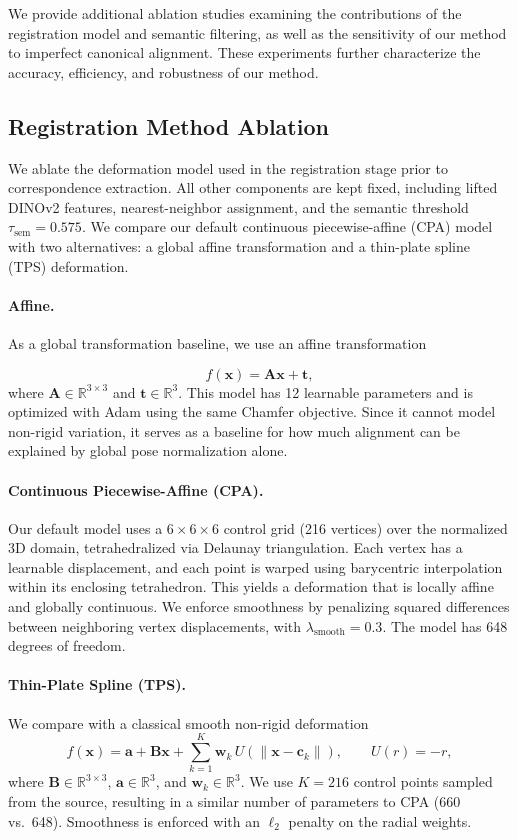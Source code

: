 We provide additional ablation studies examining the
contributions of the registration model and semantic filtering,
as well as the sensitivity of our method to imperfect
canonical alignment. These experiments further characterize
the accuracy, efficiency, and robustness of our method.

\subsection{Registration Method Ablation}
\label{sup:ablation_registration}

We ablate the deformation model used in the registration stage prior to correspondence extraction. All other components are kept fixed, including lifted DINOv2 \cite{oquab2024dinov2} features, nearest-neighbor assignment, and the semantic threshold $\tau_{\mathrm{sem}}=0.575$. We compare our default continuous piecewise-affine (CPA) model with two alternatives: a global affine transformation and a thin-plate spline (TPS) deformation.

\paragraph{Affine.}
As a global transformation baseline, we use an affine transformation

\[
f(\mathbf{x}) = \mathbf{A}\mathbf{x} + \mathbf{t},
\]
where $\mathbf{A} \in \mathbb{R}^{3\times 3}$ and $\mathbf{t} \in \mathbb{R}^{3}$. This model has 12 learnable parameters and is optimized with Adam using the same Chamfer objective. Since it cannot model non-rigid variation, it serves as a baseline for how much alignment can be explained by global pose normalization alone.

\paragraph{Continuous Piecewise-Affine (CPA).}
Our default model uses a $6 \times 6 \times 6$ control grid (216 vertices) over the normalized 3D domain, tetrahedralized via Delaunay triangulation. Each vertex has a learnable displacement, and each point is warped using barycentric interpolation within its enclosing tetrahedron. This yields a deformation that is locally affine and globally continuous. We enforce smoothness by penalizing squared differences between neighboring vertex displacements, with $\lambda_{\mathrm{smooth}}=0.3$. The model has 648 degrees of freedom.

\paragraph{Thin-Plate Spline (TPS).}
We compare with a classical smooth non-rigid deformation
\[
f(\mathbf{x}) = \mathbf{a} + \mathbf{B}\mathbf{x}
+ \sum_{k=1}^{K} \mathbf{w}_k \, U(\|\mathbf{x}-\mathbf{c}_k\|),
\qquad U(r) = -r,
\]
where $\mathbf{B}\in\mathbb{R}^{3\times3}$, $\mathbf{a}\in\mathbb{R}^{3}$, and $\mathbf{w}_k\in\mathbb{R}^{3}$. We use $K=216$ control points sampled from the source, resulting in a similar number of parameters to CPA (660 vs.\ 648). Smoothness is enforced with an $\ell_2$ penalty on the radial weights.

